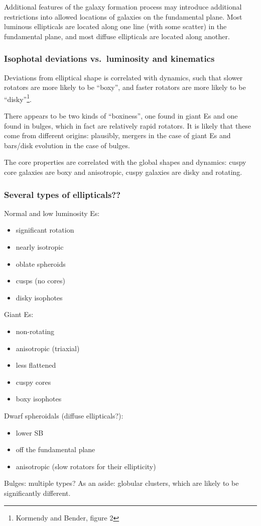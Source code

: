 \documentclass{article}
\begin{document}
Additional features of the galaxy formation process may introduce additional
restrictions into allowed locations of galaxies on the fundamental plane. Most
luminous ellipticals are located along one line (with some scatter) in the
fundamental plane, and most diffuse ellipticals are located along another.

\subsubsection{Isophotal deviations vs.\ luminosity and kinematics}
Deviations from elliptical shape is correlated with dynamics, such that slower
rotators are more likely to be ``boxy'', and faster rotators are more likely to
be ``disky''\footnote{Kormendy and Bender, figure 2}.

There appears to be two
kinds of ``boxiness'', one found in giant Es and one found in bulges, which in
fact are relatively rapid rotators.  It is likely that these come from
different origins: plausibly, mergers in the case of giant Es and bars/disk
evolution in the case of bulges.

The core properties are correlated with the global shapes and dynamics:
cuspy core galaxies are boxy and anisotropic, cuspy galaxies are
disky and rotating.

\subsubsection{Several types of ellipticals??}
Normal and low luminosity Es:
\begin{itemize}
    \item significant rotation
    \item nearly isotropic
    \item oblate spheroids
    \item cusps (no cores)
    \item disky isophotes
\end{itemize}
Giant Es:
\begin{itemize}
    \item non-rotating
    \item anisotropic (triaxial)
    \item less flattened
    \item cuspy cores
    \item boxy isophotes
\end{itemize}
Dwarf spheroidals (diffuse ellipticals?):
\begin{itemize}
    \item lower SB
    \item off the fundamental plane
    \item anisotropic (slow rotators for their ellipticity)
\end{itemize}
Bulges: multiple types? As an aside: globular clusters, which are
likely to be significantly different.
\end{document}
